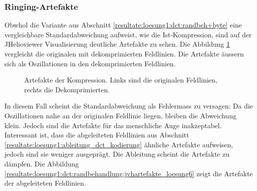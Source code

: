 \subsubsection{Ringing-Artefakte}\label{resultate:loesung1:ringing}
Obwhol die Variante aus Abschnitt \ref{resultate:loesung1:dct:randbeh+byte} eine vergleichbare Standardabweichung aufweist, wie die Ist-Kompression, sind auf der JHelioviewer Visualisierung deutliche Artefakte zu sehen. Die Abbildung \ref{resultate:loesung1:dct:randbehandlung:jvhartefakte} vergleicht die originalen mit dekomprimierten Feldlinien. Die Artefakte äussern sich als Oszillationen in den dekomprimierten Feldlinien.

\begin{figure}[!htbp]
	\center
	\caption{Artefakte der Kompression. Links sind die originalen Feldlinien, rechts die Dekomprimierten.}
	\label{resultate:loesung1:dct:randbehandlung:jvhartefakte}
\end{figure} 
In diesem Fall scheint die Standardabweichung als Fehlermass zu versagen: Da die Oszillationen nahe an der originalen Feldlinie liegen, bleiben die Abweichung klein. Jedoch sind die Artefakte für das menschliche Auge inakzeptabel.\\
Interessant ist, dass die abgeleiteten Feldlinien aus Abschnitt \ref{resultate:loesung1:ableitung_dct_kodierung} ähnliche Artefakte aufweisen, jedoch sind sie weniger ausgeprägt. Die Ableitung scheint die Artefakte zu dämpfen. Die Abbildung \ref{resultate:loesung1:dct:randbehandlung:jvhartefakte_loesung6} zeigt die Artefakte der abgeleiteten Feldlinien.

